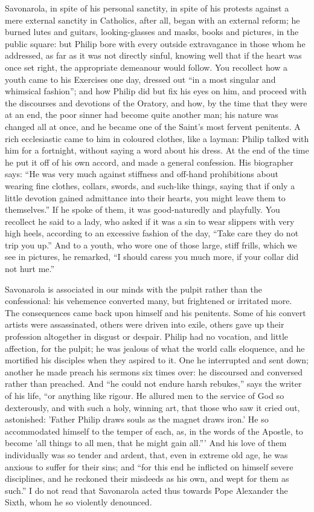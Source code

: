 Savonarola, in spite of his personal sanctity, in
spite of his protests against a mere external sanctity in
Catholics, after all, began with an external reform; he
burned lutes and guitars, looking-glasses and masks,
books and pictures, in the public square: but Philip bore
with every outside extravagance in those whom he
addressed, as far as it was not directly sinful, knowing
well that if the heart was once set right, the
appropriate demeanour would follow. You recollect how a
youth came to his Exercises one day, dressed out ``in
a most singular and whimsical fashion''; and how
Philip did but fix his eyes on him, and proceed with the
discourses and devotions of the Oratory, and how, by the
time that they were at an end, the poor sinner had become
quite another man; his nature was changed all at once,
and he became one of the Saint's most fervent penitents.
A rich ecclesiastic came to him in coloured clothes, like
a layman: Philip talked with him for a fortnight, without
saying a word about his dress. At the end of the time he
put it off of his own accord, and made a general
confession. His biographer says: ``He was very much
against stiffness and off-hand prohibitions about wearing
fine clothes, collars, swords, and such-like things,
saying that if only a little devotion gained admittance
into their hearts, you might leave them to
themselves.'' If he spoke of them, it was
good-naturedly and playfully. You recollect he said to a
lady, who asked if it was a sin to wear slippers with
very high heels, according to an excessive fashion of the
day, ``Take care they do not trip you up.'' And
to a youth, who wore one of those large, stiff frills,
which we see in pictures, he remarked, ``I should
caress you much more, if your collar did not hurt
me.''

Savonarola is associated in our minds with the pulpit
rather than the confessional: his vehemence converted
many, but frightened or irritated more. The consequences
came back upon himself and his penitents. Some of his
convert artists were assassinated, others were driven
into exile, others gave up their profession altogether in
disgust or despair. Philip had no vocation, and little
affection, for the pulpit; he was jealous of what the
world calls eloquence, and he mortified his disciples
when they aspired to it. One he interrupted and sent
down; another he made preach his sermons six times over:
he discoursed and conversed rather than preached. And
``he could not endure harsh rebukes,'' says the
writer of his life, ``or anything like rigour. He
allured men to the service of God so dexterously, and
with such a holy, winning art, that those who saw it
cried out, astonished: 'Father Philip draws souls as the
magnet draws iron.' He so accommodated himself to the
temper of each, as, in the words of the Apostle, to
become 'all things to all men, that he might gain
all.''' And his love of them individually was so
tender and ardent, that, even in extreme old age, he was
anxious to suffer for their sins; and ``for this end
he inflicted on himself severe disciplines, and he
reckoned their misdeeds as his own, and wept for them as
such.'' I do not read that Savonarola acted thus
towards Pope Alexander the Sixth, whom he so violently
denounced.

